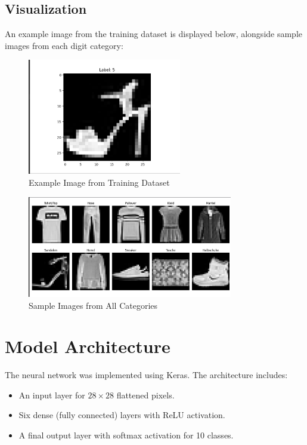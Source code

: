 \documentclass[12pt,a4paper]{article}
\begin{document}
\subsection*{Visualization}
An example image from the training dataset is displayed below, alongside sample images from each digit category:

\begin{figure}[h!]
    \centering
    \includegraphics[width=0.6\textwidth]{image-1.png}
    \caption{Example Image from Training Dataset}
    \label{fig:example-image}
\end{figure}

\begin{figure}[h!]
    \centering
    \includegraphics[width=0.8\textwidth]{image-2.png}
    \caption{Sample Images from All Categories}
    \label{fig:sample-images}
\end{figure}

\newpage

\section*{Model Architecture}
The neural network was implemented using Keras. The architecture includes:
\begin{itemize}
    \item An input layer for $28 \times 28$ flattened pixels.
    \item Six dense (fully connected) layers with ReLU activation.
    \item A final output layer with softmax activation for 10 classes.
\end{itemize}
\end{document}
